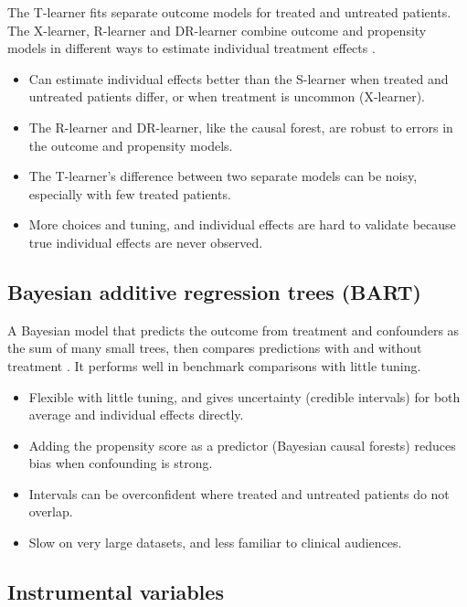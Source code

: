 The T-learner fits separate outcome models for treated and untreated patients. The X-learner, R-learner and DR-learner combine outcome and propensity models in different ways to estimate individual treatment effects \cite{kunzel2019,nie2021,kennedy2023}.
\begin{itemize}
\item[$+$] Can estimate individual effects better than the S-learner when treated and untreated patients differ, or when treatment is uncommon (X-learner).
\item[$+$] The R-learner and DR-learner, like the causal forest, are robust to errors in the outcome and propensity models.
\item[$-$] The T-learner's difference between two separate models can be noisy, especially with few treated patients.
\item[$-$] More choices and tuning, and individual effects are hard to validate because true individual effects are never observed.
\end{itemize}

\subsection{Bayesian additive regression trees (BART)}

A Bayesian model that predicts the outcome from treatment and confounders as the sum of many small trees, then compares predictions with and without treatment \cite{hill2011bart}. It performs well in benchmark comparisons with little tuning.
\begin{itemize}
\item[$+$] Flexible with little tuning, and gives uncertainty (credible intervals) for both average and individual effects directly.
\item[$+$] Adding the propensity score as a predictor (Bayesian causal forests) reduces bias when confounding is strong.
\item[$-$] Intervals can be overconfident where treated and untreated patients do not overlap.
\item[$-$] Slow on very large datasets, and less familiar to clinical audiences.
\end{itemize}

\subsection{Instrumental variables}

